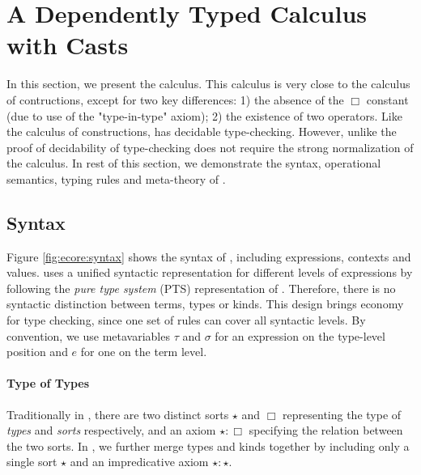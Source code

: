 
\section{A Dependently Typed Calculus with Casts}\label{sec:ecore}

In this section, we present the \ecore calculus. This calculus is very 
close to the calculus of contructions, except for two key differences: 
1) the absence of the $\Box$ constant (due to use of the "type-in-type"
axiom); 2) the existence of two \cast operators. Like the calculus 
of constructions, \ecore has decidable type-checking. However, unlike
\cc the proof of decidability of type-checking does not require 
the strong normalization of the calculus. 
In rest of this
section, we demonstrate the syntax, operational semantics, typing
rules and meta-theory of \ecore.


\subsection{Syntax}\label{sec:ecore:syn}

Figure \ref{fig:ecore:syntax} shows the syntax of \ecore, including
expressions, contexts and values. \ecore uses a unified syntactic
representation for different levels of expressions by following the
\emph{pure type system} (PTS) representation of \cc. Therefore, there
is no syntactic distinction between terms, types or kinds. This design
brings economy for type checking, since one set of rules can cover
all syntactic levels. By convention, we use metavariables $\tau$ and
$\sigma$ for an expression on the type-level position and $e$ for one
on the term level.

\paragraph{Type of Types}
Traditionally in \cc, there are two distinct
sorts $\star$ and $\Box$ representing the type of
\emph{types} and \emph{sorts} respectively, and an axiom
$\star:\Box$ specifying the relation between the two sorts. In \ecore, we further
merge types and kinds together by including only a single sort
$\star$ and an impredicative axiom $\star:\star$. 


